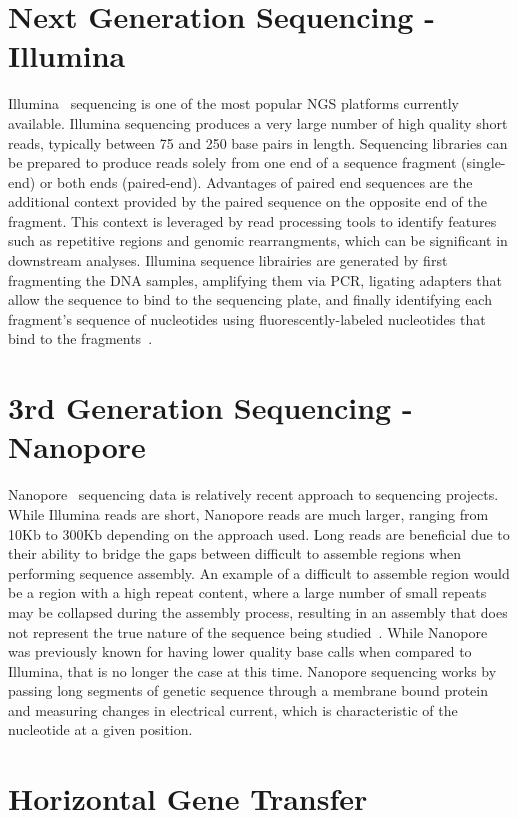 \section{Next Generation Sequencing - Illumina}
Illumina\texttrademark ~\cite{Bennett2004} sequencing is one of the
most popular NGS platforms currently available. Illumina sequencing
produces a very large number of high quality short reads, typically
between 75 and 250 base pairs in length. Sequencing libraries can be
prepared to produce reads solely from one end of a sequence fragment
(single-end) or both ends (paired-end). Advantages of paired end
sequences are the additional context provided by the paired sequence
on the opposite end of the fragment. This context is leveraged by read
processing tools to identify features such as repetitive regions and
genomic rearrangments, which can be significant in downstream
analyses. Illumina sequence librairies are generated by first
fragmenting the DNA samples, amplifying them via PCR, ligating
adapters that allow the sequence to bind to the sequencing plate, and
finally identifying each fragment's sequence of nucleotides using
fluorescently-labeled nucleotides that bind to the
fragments~\cite{Goodwin2016}.

\section{3rd Generation Sequencing - Nanopore}

Nanopore\texttrademark ~\cite{Wang2021} sequencing data is relatively
recent approach to sequencing projects. While Illumina reads are
short, Nanopore reads are much larger, ranging from 10Kb to 300Kb
depending on the approach used. Long reads are beneficial due to their
ability to bridge the gaps between difficult to assemble regions when
performing sequence assembly. An example of a difficult to assemble
region would be a region with a high repeat content, where a large
number of small repeats may be collapsed during the assembly process,
resulting in an assembly that does not represent the true nature of
the sequence being studied~\cite{Marx2023}. While Nanopore was
previously known for having lower quality base calls when compared to
Illumina, that is no longer the case at this time. Nanopore sequencing
works by passing long segments of genetic sequence through a membrane
bound protein and measuring changes in electrical current, which is
characteristic of the nucleotide at a given position.

\section{Horizontal Gene Transfer}

